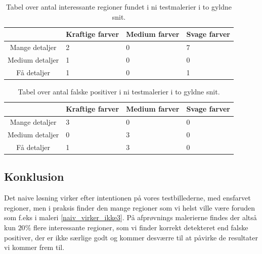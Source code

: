 \begin{table}[H]
    \centering
    \begin{tabular}{|c|l|l|l|}
			\hline
            & Kraftige farver & Medium farver & Svage farver \\\hline
		Mange detaljer	& 2 & 0 & 7 \\\hline
        Medium detaljer  & 1 & 0 & 0 \\\hline
        Få detaljer     & 1 & 0 & 1 \\\hline
    \end{tabular}
    \caption[]{Tabel over antal interessante regioner fundet i ni testmalerier i to gyldne snit.}
    \label{naiv_good}
\end{table}

\begin{table}[H]
    \centering
    \begin{tabular}{|c|l|l|l|}
			\hline
            & Kraftige farver & Medium farver & Svage farver \\\hline
		Mange detaljer	& 3 & 0 & 0 \\\hline
        Medium detaljer  & 0 & 3 & 0 \\\hline
        Få detaljer     & 1 & 3 & 0 \\\hline
    \end{tabular}
    \caption[]{Tabel over antal falske positiver i ni testmalerier i to gyldne snit.}
    \label{naiv_bad}
\end{table}

\subsection{Konklusion}
Det naive løsning virker efter intentionen på vores testbillederne, med
ensfarvet regioner, men i praksis finder den mange regioner som vi helst
ville være foruden som f.eks i maleri \ref{naiv_virker_ikke3}. På
afprøvnings malerierne findes der altså kun $20\%$ flere interessante
regioner, som vi finder korrekt detekteret end falske positiver, der er
ikke særlige godt og kommer desværre til at påvirke de resultater vi
kommer frem til.
